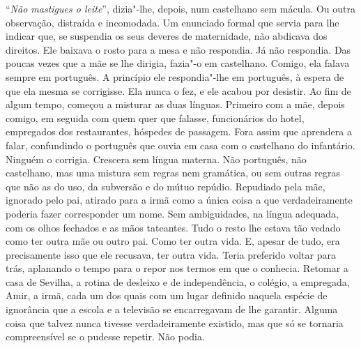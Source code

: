 ``\emph{Não mastigues o leite}'',
dizia"-lhe, depois, num castelhano sem mácula. Ou outra observação,
distraída e incomodada. Um enunciado formal que servia para lhe indicar
que, se suspendia os seus deveres de maternidade, não abdicava dos
direitos. Ele baixava o rosto para a mesa e não respondia. Já não
respondia. Das poucas vezes que a mãe se lhe dirigia, fazia"-o em
castelhano. Comigo, ela falava sempre em português. A princípio ele
respondia"-lhe em português, à espera de que ela mesma se corrigisse.
Ela nunca o fez, e ele acabou por desistir. Ao fim de algum tempo,
começou a misturar as duas línguas. Primeiro com a mãe, depois comigo,
em seguida com quem quer que falasse, funcionários do hotel, empregados
dos restaurantes, hóspedes de passagem. Fora assim que aprendera a
falar, confundindo o português que ouvia em casa com o castelhano do
infantário. Ninguém o corrigia. Crescera sem língua materna. Não
português, não castelhano, mas uma mistura sem regras nem gramática, ou
sem outras regras que não as do uso, da subversão e do mútuo repúdio.
Repudiado pela mãe, ignorado pelo pai, atirado para a irmã como a única
coisa a que verdadeiramente poderia fazer corresponder um nome. Sem
ambiguidades, na língua adequada, com os olhos fechados e as mãos
tateantes. Tudo o resto lhe estava tão vedado como ter outra mãe ou
outro pai. Como ter outra vida. E, apesar de tudo, era precisamente isso
que ele recusava, ter outra vida. Teria preferido voltar para trás,
aplanando o tempo para o repor nos termos em que o conhecia. Retomar a
casa de Sevilha, a rotina de desleixo e de independência, o colégio, a
empregada, Amir, a irmã, cada um dos quais com um lugar definido naquela
espécie de ignorância que a escola e a televisão se encarregavam de lhe
garantir. Alguma coisa que talvez nunca tivesse verdadeiramente
existido, mas que só se tornaria compreensível se o pudesse repetir. Não
podia.

